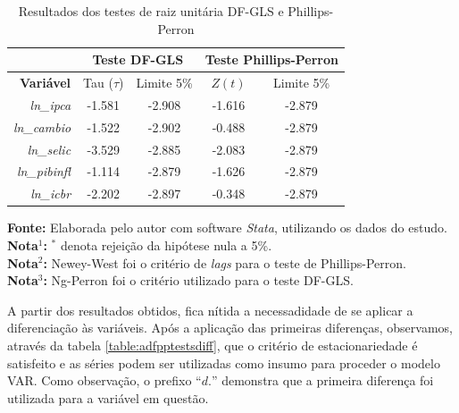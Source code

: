 \documentclass[12pt,oneside,a4paper,chapter=TITLE,english,brazil,sumario=abnt-6027-2012]{abntex2}
\begin{document}
\begin{table}[H]
\centering
\caption{Resultados dos testes de raiz unitária DF-GLS e Phillips-Perron}
\label{table:adfpptests}
\renewcommand{\arraystretch}{1.1}
\begin{tabular}{rcc|cc}
\hline
 & \multicolumn{2}{c|}{\textbf{Teste DF-GLS}} 
 & \multicolumn{2}{c}{\textbf{Teste Phillips-Perron}} \\
\hline
\textbf{Variável}    & Tau ($\tau$) & Limite 5\% & $Z(t)$ & Limite 5\% \\ 
\textit{ln\_ipca}    & -1.581       & -2.908     & -1.616 & -2.879     \\
\textit{ln\_cambio}  & -1.522       & -2.902     & -0.488 & -2.879     \\
\textit{ln\_selic}   & -3.529       & -2.885     & -2.083 & -2.879     \\
\textit{ln\_pibinfl} & -1.114       & -2.879     & -1.626 & -2.879     \\
\textit{ln\_icbr}    & -2.202       & -2.897     & -0.348 & -2.879     \\
\hline
\end{tabular}
\vspace{1ex}
\begin{minipage}{0.9\linewidth}
\footnotesize
\textbf{Fonte:} Elaborada pelo autor com software \textit{Stata}, utilizando os dados do estudo.\\
\textbf{Nota$^1$:} $^*$ denota rejeição da hipótese nula a 5\%.\\
\textbf{Nota$^2$:} Newey-West foi o critério de \textit{lags} para o teste de Phillips-Perron.\\
\textbf{Nota$^3$:} Ng-Perron foi o critério utilizado para o teste DF-GLS.
\end{minipage}
\end{table}

A partir dos resultados obtidos, fica nítida a necessadidade de se aplicar a diferenciação às variáveis. Após a aplicação das primeiras diferenças, observamos, através da tabela \ref{table:adfpptestsdiff}, que o critério de estacionariedade é satisfeito e as séries podem ser utilizadas como insumo para proceder o modelo VAR. Como observação, o prefixo ``$d.$'' demonstra que a primeira diferença foi utilizada para a variável em questão.
\end{document}
